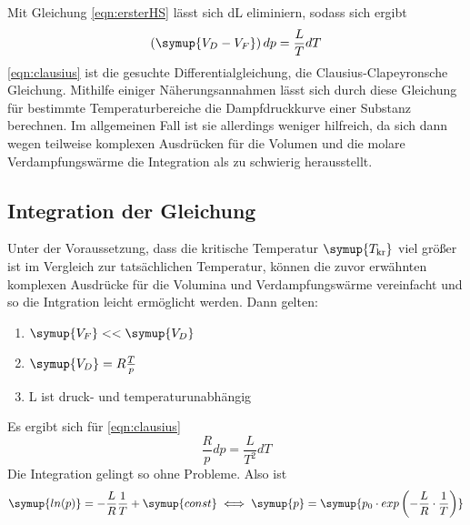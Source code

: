 Mit Gleichung \eqref{eqn:ersterHS} lässt sich dL eliminiern, sodass sich ergibt
\begin{equation}
    \left( \symup{ V_D - V_F} \right) dp = \frac{L}{T} dT
    \label{eqn:clausius}
\end{equation}
\eqref{eqn:clausius} ist die gesuchte Differentialgleichung, die Clausius-Clapeyronsche
Gleichung. Mithilfe einiger Näherungsannahmen lässt sich durch diese Gleichung
für bestimmte Temperaturbereiche die Dampfdruckkurve einer Substanz berechnen. Im 
allgemeinen Fall ist sie allerdings weniger hilfreich, da sich dann wegen teilweise
komplexen Ausdrücken für die Volumen und die molare Verdampfungswärme die Integration
als zu schwierig herausstellt.

\subsection{Integration der Gleichung}
Unter der Voraussetzung, dass die kritische Temperatur $\symup{T_\text{kr}}$ viel größer
ist im Vergleich zur tatsächlichen Temperatur, können die zuvor erwähnten komplexen
Ausdrücke für die Volumina und Verdampfungswärme vereinfacht und so die Intgration 
leicht ermöglicht werden. Dann gelten:
\begin{enumerate}
    \item $\symup{V_F} << \symup{V_D}$
    \item $\symup{V_D} = R \frac{T}{p}$
    \item L ist druck- und temperaturunabhängig
\end{enumerate}
Es ergibt sich für \eqref{eqn:clausius}
\begin{equation*}
\frac{R}{p} dp = \frac{L}{T^2} dT
\end{equation*}
Die Integration gelingt so ohne Probleme. Also ist
\begin{equation}
\symup{ln(p)} = - \frac{L}{R} \frac{1}{T} + \symup{const}\\
\iff \symup{p} = \symup{p_0 \cdot exp \left( - \frac{L}{R} \cdot \frac{1}{T} \right)}
\end{equation}
